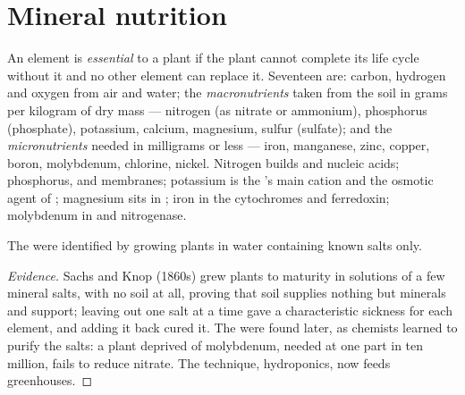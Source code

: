 \section{Mineral nutrition}

\begin{definition}\label{def:b1:plant-water-minerals:elements}
An element is \emph{essential} to a plant if the plant cannot
complete its life cycle without it and no other element can replace
it. Seventeen are: carbon, hydrogen and oxygen from air and water; the
\emph{macronutrients} taken from the soil in grams per kilogram of
dry mass --- nitrogen (as nitrate or ammonium), phosphorus (phosphate),
potassium, calcium, magnesium, sulfur (sulfate); and the
\emph{micronutrients} needed in milligrams or less --- iron, manganese,
zinc, copper, boron, molybdenum, chlorine, nickel. Nitrogen builds
 and nucleic acids; phosphorus,  and membranes;
potassium is the 's main cation and the osmotic agent of ;
magnesium sits in ; iron in the cytochromes and
ferredoxin; molybdenum in  and nitrogenase.
\end{definition}

\begin{proposition}\label{prop:b1:plant-water-minerals:hydroponics}
The  were identified by growing plants in water
containing known salts only.
\end{proposition}
\begin{proof}[Evidence]
Sachs and Knop (1860s) grew plants to maturity in solutions of a few
mineral salts, with no soil at all, proving that soil supplies
nothing but minerals and support; leaving out one salt at a time gave
a characteristic sickness for each element, and adding it back cured
it. The  were found later, as chemists learned to
purify the salts: a plant deprived of molybdenum, needed at one part
in ten million, fails to reduce nitrate. The technique, hydroponics,
now feeds greenhouses.
\end{proof}

